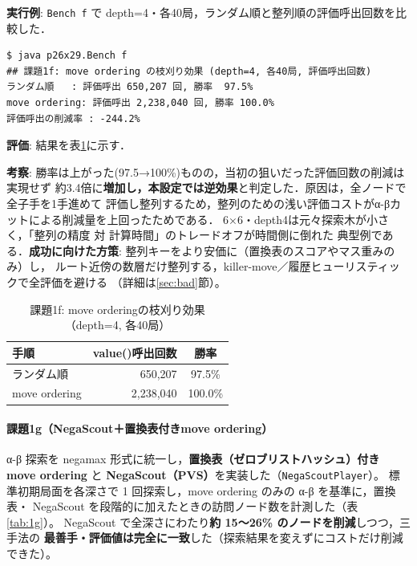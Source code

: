 \documentclass[11pt,a4j]{ujarticle} %
\begin{document}
\textbf{実行例}: {\verb+Bench f+} で depth=4・各40局，ランダム順と整列順の評価呼出回数を比較した．
\begin{lstlisting}[caption=課題1fの実行例,label=ex:1f]
$ java p26x29.Bench f
## 課題1f: move ordering の枝刈り効果 (depth=4, 各40局, 評価呼出回数)
ランダム順   : 評価呼出 650,207 回, 勝率  97.5%
move ordering: 評価呼出 2,238,040 回, 勝率 100.0%
評価呼出の削減率 : -244.2%
\end{lstlisting}

\textbf{評価}: 結果を表\ref{tab:1f}に示す．

\textbf{考察}: 勝率は上がった(97.5→100\%)ものの，当初の狙いだった評価回数の削減は実現せず
約3.4倍に\textbf{増加し，本設定では逆効果}と判定した．原因は，全ノードで全子手を1手進めて
評価し整列するため，整列のための浅い評価コストがα-βカットによる削減量を上回ったためである．
6×6・depth4は元々探索木が小さく，「整列の精度 対 計算時間」のトレードオフが時間側に倒れた
典型例である．\textbf{成功に向けた方策}: 整列キーをより安価に（置換表のスコアやマス重みのみ）し，
ルート近傍の数層だけ整列する，killer-move／履歴ヒューリスティックで全評価を避ける
（詳細は\ref{sec:bad}節）。

\begin{table}[h]\center
\caption{課題1f: move orderingの枝刈り効果（depth=4, 各40局）}\label{tab:1f}
\begin{tabular}{l|r|c}
手順 & value()呼出回数 & 勝率 \\ \hline\hline
ランダム順 & 650{,}207 & 97.5\% \\
move ordering & 2{,}238{,}040 & 100.0\% \\
\end{tabular}
\end{table}

\paragraph{課題1g（NegaScout＋置換表付きmove ordering）}
α-β 探索を negamax 形式に統一し，\textbf{置換表（ゼロブリストハッシュ）付き
move ordering} と \textbf{NegaScout（PVS）}を実装した（{\verb+NegaScoutPlayer+}）。
標準初期局面を各深さで 1 回探索し，move ordering のみの α-β を基準に，置換表・
NegaScout を段階的に加えたときの訪問ノード数を計測した（表\ref{tab:1g}）。
NegaScout で全深さにわたり\textbf{約 15〜26\% のノードを削減}しつつ，三手法の
\textbf{最善手・評価値は完全に一致}した（探索結果を変えずにコストだけ削減できた）。
\end{document}

